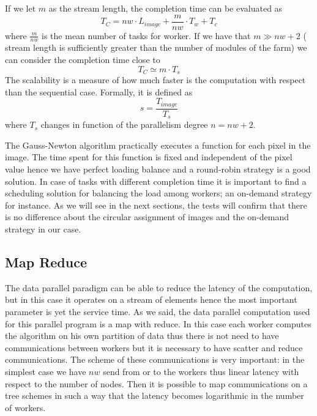 If we let $m$ as the stream length, the completion time can be evaluated as
\[
T_{C} = nw \cdot L_{image} + \frac{m}{nw} \cdot T_{w} + T_{c} 
\]
where $\frac{m}{nw}$ is the mean number of tasks for worker.
If we have that $m \gg nw+2$ ( stream length is sufficiently greater than the number of modules of the farm) we can consider the completion time close to
\begin{equation}
\label{completiontime}
T_{C} \simeq m \cdot T_{s}
\end{equation}
The scalability is a measure of how much faster is the computation with respect than the sequential case. 
Formally, it is defined as
\begin{equation}
\label{scalability}
s = \frac{T_{image}}{T_{s}}
\end{equation}
where $T_{s}$ changes in function of the parallelism degree $n=nw+2$.

The Gauss-Newton algorithm practically executes a function for each pixel in the image. 
The time spent for this function is fixed and independent of the pixel value hence we have perfect loading balance and a round-robin strategy is a good solution. 
In case of tasks with different completion time it is important to find a scheduling solution for balancing the load among workers; an on-demand strategy for instance. 
As we will see in the next sections, the tests will confirm that there is no difference about the circular assignment of images and the on-demand strategy in our case.

\subsection{Map Reduce}
\label{data_cost}

The data parallel paradigm can be able to reduce the latency of the computation, but in this case it operates on a stream of elements hence the most important parameter is yet the service time. 
As we said, the data parallel computation used for this parallel program is a map with reduce.
In this case each worker computes the algorithm on his own partition of data thus there is not need to have communications between workers but it is necessary to have scatter and reduce communications. 
The scheme of these communications is very important: in the simplest case we have $nw$ send from or to the workers thus linear latency with respect to the number of nodes.
Then it is possible to map communications on a tree schemes in such a way that the latency becomes logarithmic in the number of workers. 

